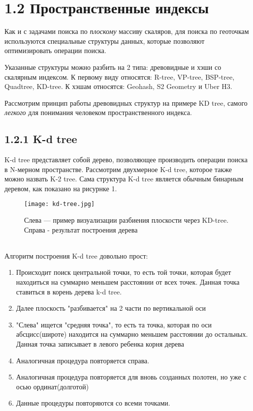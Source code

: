 
\section{1.2 Пространственные индексы}
Как и с задачами поиска по \textit{плоскому} массиву скаляров, для поиска по геоточкам используются специальные структуры данных, которые позволяют оптимизировать операции поиска. 

Указанные структуры можно разбить на 2 типа: древовидные и хэши со скалярным индексом. К первому виду относятся: R-tree, VP-tree, BSP-tree, Quadtree, KD-tree. К хэшам относятся: Geohash, S2 Geometry и Uber H3.

Рассмотрим принцип работы древовидных структур на примере KD tree, самого \textit{легкого} для понимания человеком пространственного индекса.

\subsection{1.2.1 K-d tree}
K-d tree представляет собой дерево, позволяющее производить операции поиска в N-мерном пространстве. Рассмотрим двухмерное K-d tree, которое также можно назвать K-2 tree.
Сама структура K-d tree является обычным бинарным деревом, как показано на рисурнке 1.
  \\
\begin{figure}[h]
    \centering
    \texttt{[image: kd-tree.jpg]}
    \caption{Слева — пример визуализации разбиения плоскости через KD-tree. Справа - результат построения дерева}
\end{figure}
  \\
Алгоритм построения K-d tree довольно прост:
\begin{enumerate}
    \item Происходит поиск центральной точки, то есть той точки, которая будет находиться на суммарно меньшем расстоянии от всех точек. Данная точка ставиться в корень дерева k-d tree.
    \item Далее плоскость "разбивается" на 2 части по вертикальной оси
    \item "Слева" ищется "средняя точка", то есть та точка, которая по оси абсцисс(широте) находится на суммарно меньшем расстоянии до остальных. Данная точка записывает в левого ребенка корня дерева
    \item Аналогичная процедура повторяется справа.
    \item Аналогичная процедура повторяется для вновь созданных полотен, но уже с осью ординат(долготой)
    \item Данные процедуры повторяются со всеми точками.
\end{enumerate}


